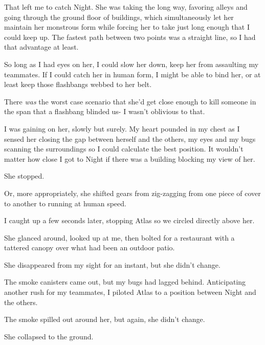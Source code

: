 That left me to catch Night.  She was taking the long way, favoring alleys and going through the ground floor of buildings, which simultaneously let her maintain her monstrous form while forcing her to take just long enough that I could keep up.  The fastest path between two points was a straight line, so I had that advantage at least.



So long as I had eyes on her, I could slow her down, keep her from assaulting my teammates.  If I could catch her in human form, I might be able to bind her, or at least keep those flashbangs webbed to her belt.



There \emph{was} the worst case scenario that she'd get close enough to kill someone in the span that a flashbang blinded us-  I wasn't oblivious to that.



I was gaining on her, slowly but surely.  My heart pounded in my chest as I sensed her closing the gap between herself and the others, my eyes and my bugs scanning the surroundings so I could calculate the best position.  It wouldn't matter how close I got to Night if there was a building blocking my view of her.



She stopped.



Or, more appropriately, she shifted gears from zig-zagging from one piece of cover to another to running at human speed.



I caught up a few seconds later, stopping Atlas so we circled directly above her.



She glanced around, looked up at me, then bolted for a restaurant with a tattered canopy over what had been an outdoor patio.



She disappeared from my sight for an instant, but she didn't change.



The smoke canisters came out, but my bugs had lagged behind.  Anticipating another rush for my teammates, I piloted Atlas to a position between Night and the others.



The smoke spilled out around her, but again, she didn't change.



She collapsed to the ground.



